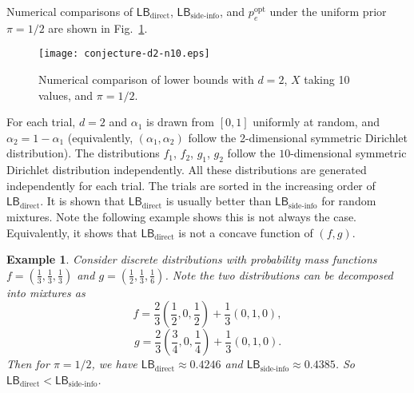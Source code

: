 \documentclass[conference,letterpaper]{IEEEtran}
\newtheorem{exam}{Example}
\newcommand{\figWidth}{0.48\textwidth}%
\newcommand{\mixWeight}{\alpha}%
\newcommand{\LBDirect}{\mathsf{LB}_{\text{direct}}}%
\newcommand{\LBSide}{\mathsf{LB}_{\text{side-info}}}%
\newcommand{\errorOpt}{p_e^{\mathrm{opt}}}
\begin{document}
Numerical comparisons of $\LBDirect$, $\LBSide$, and $\errorOpt$
under the uniform prior $\pi = 1/2$ are shown in Fig.~\ref{fig:conj}.
\begin{figure}[htbp]
  \centering
  \texttt{[image: conjecture-d2-n10.eps]}
  \caption{Numerical comparison of lower bounds with $d = 2$, $X$
    taking 10 values, and $\pi = 1/2$.}
  \label{fig:conj}
\end{figure}%
For each trial, $d = 2$ and $\mixWeight_1$ is drawn from $[0, 1]$
uniformly at random, and $\mixWeight_2 = 1 - \mixWeight_1$
(equivalently, $(\mixWeight_1, \mixWeight_2)$ follow the 2-dimensional
symmetric Dirichlet distribution).  The distributions $f_1$, $f_2$,
$g_1$, $g_2$ follow the $10$-dimensional symmetric Dirichlet
distribution independently.  All these distributions are generated
independently for each trial.  The trials are sorted in the increasing
order of $\LBDirect$.  It is shown that $\LBDirect$ is usually better
than $\LBSide$ for random mixtures.  Note the following example shows
this is not always the case.  Equivalently, it shows that $\LBDirect$
is not a concave function of $(f, g)$.
\begin{exam}
  \label{exam:lbd-nonconcave}
  Consider discrete distributions with probability mass functions
  $f = (\frac 13, \frac 13, \frac 13)$ and
  $g = (\frac 12, \frac 13, \frac 16)$.  Note the two distributions
  can be decomposed into mixtures as
  \[f = \frac 23\left(\frac 12, 0, \frac 12\right) + \frac 13(0, 1, 0),\]
  \[g = \frac 23\left(\frac 34, 0, \frac 14\right) + \frac 13(0, 1,
    0).\]
  Then for $\pi = 1/2$, we have $\LBDirect \approx 0.4246$ and
  $\LBSide \approx 0.4385$.  So $\LBDirect < \LBSide$.
\end{exam}
\end{document}
